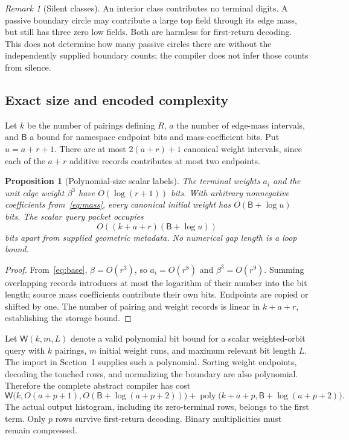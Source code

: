 \documentclass[11pt]{article}
\newtheorem{proposition}[theorem]{Proposition}
\theoremstyle{definition}\newtheorem{definition}[theorem]{Definition}\newtheorem{example}[theorem]{Example}
\theoremstyle{remark}\newtheorem{remark}[theorem]{Remark}
\newcommand{\poly}{\operatorname{poly}}
\newcommand{\bits}{\mathsf B}
\newcommand{\W}{\mathsf W}
\begin{document}
\begin{remark}[Silent classes]
An interior class contributes no terminal digits. A passive boundary circle may contribute a large top field through its edge mass, but still has three zero low fields. Both are harmless for first-return decoding. This does not determine how many passive circles there are without the independently supplied boundary counts; the compiler does not infer those counts from silence.
\end{remark}

\subsection{Exact size and encoded complexity}
Let $k$ be the number of pairings defining $R$, $a$ the number of edge-mass intervals, and $\bits$ a bound for namespace endpoint bits and mass-coefficient bits. Put $u=a+r+1$. There are at most $2(a+r)+1$ canonical weight intervals, since each of the $a+r$ additive records contributes at most two endpoints.

\begin{proposition}[Polynomial-size scalar labels]
\label{prop:bits}
The terminal weights $a_i$ and the unit edge weight $\beta^3$ have $O(\log(r+1))$ bits. With arbitrary nonnegative coefficients from~\eqref{eq:mass}, every canonical initial weight has $O(\bits+\log u)$ bits. The scalar query packet occupies
\[
                            O((k+a+r)(\bits+\log u))
\]
bits apart from supplied geometric metadata. No numerical gap length is a loop bound.
\end{proposition}
\begin{proof}
From~\eqref{eq:base}, $\beta=O(r^3)$, so $a_i=O(r^8)$ and $\beta^3=O(r^9)$. Summing overlapping records introduces at most the logarithm of their number into the bit length; source mass coefficients contribute their own bits. Endpoints are copied or shifted by one. The number of pairing and weight records is linear in $k+a+r$, establishing the storage bound.
\end{proof}

Let $\W(k,m,L)$ denote a valid polynomial bit bound for a scalar weighted-orbit query with $k$ pairings, $m$ initial weight runs, and maximum relevant bit length $L$. The import in Section~1 supplies such a polynomial. Sorting weight endpoints, decoding the touched rows, and normalizing the boundary are also polynomial. Therefore the complete abstract compiler has cost
\begin{equation}\label{eq:cost}
 \W\bigl(k,O(a+p+1),O(\bits+\log(a+p+2))\bigr)
       +\poly\bigl(k+a+p,\bits+\log(a+p+2)\bigr).
\end{equation}
The actual output histogram, including its zero-terminal rows, belongs to the first term. Only $p$ rows survive first-return decoding. Binary multiplicities must remain compressed.
\end{document}
